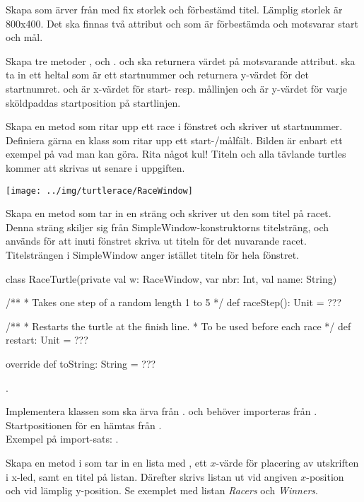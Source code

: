 \Task {}

\Subtask Skapa  som ärver från  med fix storlek och förbestämd titel. Lämplig storlek är 800x400. Det ska finnas två attribut  och  som är förbestämda och motsvarar start och mål.

\Subtask Skapa tre metoder ,  och .  och  ska returnera värdet på motsvarande attribut.  ska ta in ett heltal  som är ett startnummer och returnera y-värdet för det startnumret.  och  är x-värdet för start- resp. mållinjen och  är y-värdet för varje sköldpaddas startposition på startlinjen.

\Subtask Skapa en metod  som ritar upp ett race i fönstret och skriver ut startnummer. Definiera gärna en klass som ritar upp ett start-/målfält. Bilden är enbart ett exempel på vad man kan göra. Rita något kul! Titeln och alla tävlande turtles kommer att skrivas ut senare i uppgiften.

\texttt{[image: ../img/turtlerace/RaceWindow]}

\Subtask Skapa en metod  som tar in en sträng och skriver ut den som titel på racet. Denna sträng skiljer sig från SimpleWindow-konstruktorns titelsträng, och används för att inuti fönstret skriva ut titeln för det nuvarande racet. Titelsträngen i SimpleWindow anger istället titeln för hela fönstret.

\begin{Code}
class RaceTurtle(private val w: RaceWindow,
var nbr: Int, val name: String) {
/**
* Takes one step of a random length 1 to 5
*/
def raceStep(): Unit = ???

/**
* Restarts the turtle at the finish line.
* To be used before each race
*/
def restart: Unit = ???

override def toString: String = ???
}
\end{Code}

\Task {}.

\Subtask Implementera klassen  som ska ärva från .  och  behöver importeras från . Startpositionen för en  hämtas från .\\Exempel på import-sats: .

\Subtask Skapa en metod  i  som tar in en lista med , ett $x$-värde för placering av utskriften i x-led, samt en titel på listan. Därefter skrivs listan ut vid angiven $x$-position och vid lämplig y-position. Se exemplet med listan \textit{Racers} och \textit{Winners}.


